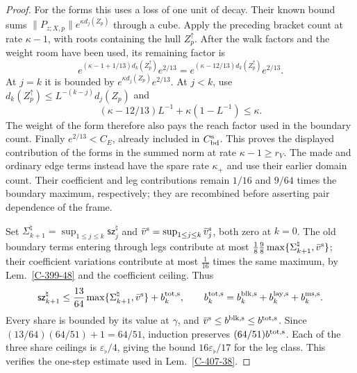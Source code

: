 \documentclass[11pt,letterpaper,reqno]{amsart}
\theoremstyle{definition}
\theoremstyle{remark}
\begin{document}
\begin{proof}
For the forms this uses a loss of one unit of decay.
Their known bound sums $\|P_{z;X,p}\|e^{\kappa d_j(Z_p)}$
through a cube. Apply the preceding bracket count at
rate $\kappa-1$, with roots containing the hull
$Z_p^\uparrow$. After the walk factors and the weight
room have been used, its remaining factor is
\[
 e^{(\kappa-1+1/13)d_k(Z_p^\uparrow)}e^{2/13}
   =e^{(\kappa-12/13)d_k(Z_p^\uparrow)}e^{2/13}.
\]
At $j=k$ it is bounded by $e^{\kappa d_j(Z_p)}e^{2/13}$.
At $j<k$, use $d_k(Z_p^\uparrow)\le L^{-(k-j)}d_j(Z_p)$
and
\[
 (\kappa-12/13)L^{-1}+\kappa(1-L^{-1})\le\kappa.
\]
The weight of the form therefore also pays the reach
factor used in the boundary count. Finally
$e^{2/13}<C_E$, already included in $C_{\rm bd}^{\rm s}$.
This proves the displayed contribution of the forms
in the summed norm at rate $\kappa-1\ge r_V$.
The made and ordinary edge terms instead have the
spare rate $\kappa_+$ and use their earlier domain count.
Their coefficient and leg contributions remain
$1/16$ and $9/64$ times the boundary maximum,
respectively; they are recombined before asserting
pair dependence of the frame.

Set $\Sigma_{k+1}^\natural=\sup_{1\le j\le k}
\mathsf{sz}_j^\natural$ and
$\bar v^{\rm s}=\sup_{1\le j\le k}\bar v_j^{\rm s}$, both
zero at $k=0$. The old boundary terms entering through legs
contribute at most $\frac18\frac98
\max\{\Sigma_{k+1}^\natural,\bar v^{\rm s}\}$; their
coefficient variations contribute at most $\frac1{16}$ times
the same maximum, by Lem.~\ref{C-399-48} and the coefficient
ceiling. Thus
\[
 \mathsf{sz}_{k+1}^\natural
 \le\frac{13}{64}\max\{\Sigma_{k+1}^\natural,\bar v^{\rm s}\}
       +b_k^{\rm tot,s},\qquad
 b_k^{\rm tot,s}=b_k^{\rm blk,s}+b_k^{\rm lay,s}+b_k^{\rm ms,s}.
\]
Every share is bounded by its value at $\gamma$, and
$\bar v^{\rm s}\le b^{\rm blk,s}\le b^{\rm tot,s}$.
Since $(13/64)(64/51)+1=64/51$, induction preserves
$(64/51)b^{\rm tot,s}$. Each of the three share ceilings is
$\varepsilon_\flat/4$, giving the bound
$16\varepsilon_\flat/17$ for the leg class. This verifies
the one-step estimate used in Lem.~\ref{C-407-38}.


\end{proof}
\end{document}
